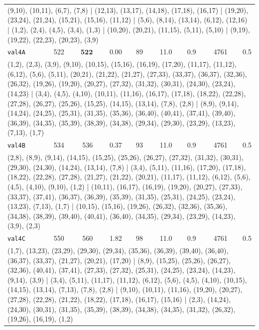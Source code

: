 \begin{longtable}{lrrrrrrrr}
\multicolumn{9}{p{0.96\linewidth}}{\tiny\raggedright\arraybackslash (9,10), (10,11), (6,7), (7,8) | (12,13), (13,17), (14,18), (17,18), (16,17) | (19,20), (23,24), (21,24), (15,21), (15,16), (11,12) | (5,6), (8,14), (13,14), (6,12), (12,16) | (1,2), (2,4), (4,5), (3,4), (1,3) | (10,20), (20,21), (11,15), (5,11), (5,10) | (9,19), (19,22), (22,23), (20,23), (3,9)} \\[2pt]
\texttt{val4A} & 522 & $\mathbf{522}$ & 0.00 & 89 & 11.0 & 0.9 & 4761 & 0.5 \\
\multicolumn{9}{p{0.96\linewidth}}{\tiny\raggedright\arraybackslash (1,2), (2,3), (3,9), (9,10), (10,15), (15,16), (16,19), (17,20), (11,17), (11,12), (6,12), (5,6), (5,11), (20,21), (21,22), (21,27), (27,33), (33,37), (36,37), (32,36), (26,32), (19,26), (19,20), (20,27), (27,32), (31,32), (30,31), (24,30), (23,24), (14,23) | (3,4), (4,5), (4,10), (10,11), (11,16), (16,17), (17,18), (18,22), (22,28), (27,28), (26,27), (25,26), (15,25), (14,15), (13,14), (7,8), (2,8) | (8,9), (9,14), (14,24), (24,25), (25,31), (31,35), (35,36), (36,40), (40,41), (37,41), (39,40), (36,39), (34,35), (35,39), (38,39), (34,38), (29,34), (29,30), (23,29), (13,23), (7,13), (1,7)} \\[2pt]
\texttt{val4B} & 534 & 536 & 0.37 & 93 & 11.0 & 0.9 & 4761 & 0.5 \\
\multicolumn{9}{p{0.96\linewidth}}{\tiny\raggedright\arraybackslash (2,8), (8,9), (9,14), (14,15), (15,25), (25,26), (26,27), (27,32), (31,32), (30,31), (29,30), (24,30), (14,24), (13,14), (7,8) | (3,4), (5,11), (11,16), (17,20), (17,18), (18,22), (22,28), (27,28), (21,27), (21,22), (20,21), (11,17), (11,12), (6,12), (5,6), (4,5), (4,10), (9,10), (1,2) | (10,11), (16,17), (16,19), (19,20), (20,27), (27,33), (33,37), (37,41), (36,37), (36,39), (35,39), (31,35), (25,31), (24,25), (23,24), (13,23), (7,13), (1,7) | (10,15), (15,16), (19,26), (26,32), (32,36), (35,36), (34,38), (38,39), (39,40), (40,41), (36,40), (34,35), (29,34), (23,29), (14,23), (3,9), (2,3)} \\[2pt]
\texttt{val4C} & 550 & 560 & 1.82 & 98 & 11.0 & 0.9 & 4761 & 0.5 \\
\multicolumn{9}{p{0.96\linewidth}}{\tiny\raggedright\arraybackslash (1,7), (13,23), (23,29), (29,30), (29,34), (35,36), (36,39), (39,40), (36,40), (36,37), (33,37), (21,27), (20,21), (17,20) | (8,9), (15,25), (25,26), (26,27), (32,36), (40,41), (37,41), (27,33), (27,32), (25,31), (24,25), (23,24), (14,23), (9,14), (3,9) | (3,4), (5,11), (11,17), (11,12), (6,12), (5,6), (4,5), (4,10), (10,15), (14,15), (13,14), (7,13), (7,8), (2,8) | (9,10), (10,11), (11,16), (19,20), (20,27), (27,28), (22,28), (21,22), (18,22), (17,18), (16,17), (15,16) | (2,3), (14,24), (24,30), (30,31), (31,35), (35,39), (38,39), (34,38), (34,35), (31,32), (26,32), (19,26), (16,19), (1,2)} \\[2pt]

\end{longtable}
